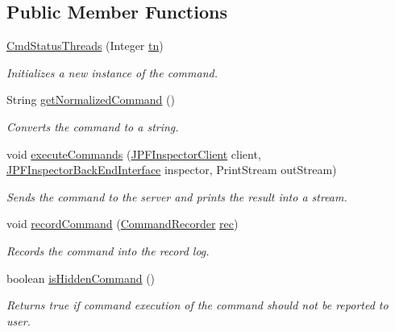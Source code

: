 \subsection*{Public Member Functions}
\begin{DoxyCompactItemize}
\item 
\hyperlink{classgov_1_1nasa_1_1jpf_1_1inspector_1_1client_1_1commands_1_1_cmd_status_threads_a8f9095697ff0b400eeb2ad7dacf175c7}{Cmd\+Status\+Threads} (Integer \hyperlink{classgov_1_1nasa_1_1jpf_1_1inspector_1_1client_1_1commands_1_1_cmd_status_threads_afa72fece4b1cb85e254c99e42a8e553f}{tn})
\begin{DoxyCompactList}\small\item\em Initializes a new instance of the command. \end{DoxyCompactList}\item 
String \hyperlink{classgov_1_1nasa_1_1jpf_1_1inspector_1_1client_1_1commands_1_1_cmd_status_threads_a6ed4c05c02786ca9d5020e1e5d0788fd}{get\+Normalized\+Command} ()
\begin{DoxyCompactList}\small\item\em Converts the command to a string. \end{DoxyCompactList}\item 
void \hyperlink{classgov_1_1nasa_1_1jpf_1_1inspector_1_1client_1_1commands_1_1_cmd_status_threads_a1205b58bf3e3cd19fb8ff01026cd2e6e}{execute\+Commands} (\hyperlink{classgov_1_1nasa_1_1jpf_1_1inspector_1_1client_1_1_j_p_f_inspector_client}{J\+P\+F\+Inspector\+Client} client, \hyperlink{interfacegov_1_1nasa_1_1jpf_1_1inspector_1_1interfaces_1_1_j_p_f_inspector_back_end_interface}{J\+P\+F\+Inspector\+Back\+End\+Interface} inspector, Print\+Stream out\+Stream)
\begin{DoxyCompactList}\small\item\em Sends the command to the server and prints the result into a stream. \end{DoxyCompactList}\item 
void \hyperlink{classgov_1_1nasa_1_1jpf_1_1inspector_1_1client_1_1_client_command_ae0670332ec750bc5b9016d0b04d8adfe}{record\+Command} (\hyperlink{classgov_1_1nasa_1_1jpf_1_1inspector_1_1client_1_1_command_recorder}{Command\+Recorder} \hyperlink{classgov_1_1nasa_1_1jpf_1_1inspector_1_1client_1_1_client_command_af4246f2427035c72a6af45a2c61361f7}{rec})
\begin{DoxyCompactList}\small\item\em Records the command into the record log. \end{DoxyCompactList}\item 
boolean \hyperlink{classgov_1_1nasa_1_1jpf_1_1inspector_1_1client_1_1_client_command_afb09c400c64e2d8e01059b91ff847761}{is\+Hidden\+Command} ()
\begin{DoxyCompactList}\small\item\em Returns true if command execution of the command should not be reported to user. \end{DoxyCompactList}\end{DoxyCompactItemize}
